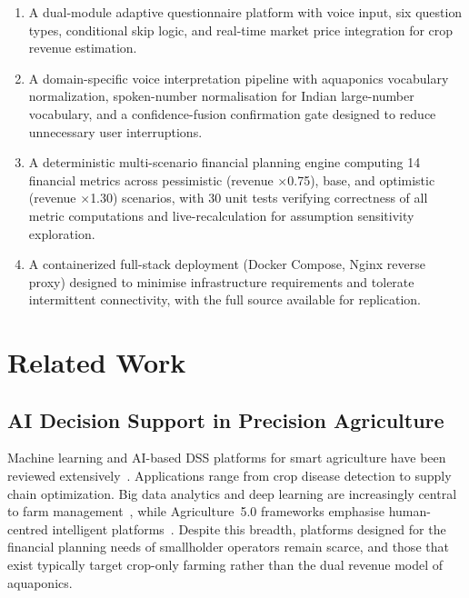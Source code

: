 \documentclass[runningheads]{llncs}
\begin{document}
\begin{enumerate}
  \item A dual-module adaptive questionnaire platform with voice
        input, six question types, conditional skip logic, and
        real-time market price integration for crop revenue estimation.

  \item A domain-specific voice interpretation pipeline with
        aquaponics vocabulary normalization, spoken-number normalisation
        for Indian large-number vocabulary, and a confidence-fusion
        confirmation gate designed to reduce unnecessary user interruptions.

  \item A deterministic multi-scenario financial planning engine
        computing 14 financial metrics across pessimistic
        (revenue $\times$0.75), base, and optimistic
        (revenue $\times$1.30) scenarios, with 30 unit tests
        verifying correctness of all metric computations and
        live-recalculation for assumption sensitivity exploration.

  \item A containerized full-stack deployment (Docker Compose,
        Nginx reverse proxy) designed to minimise infrastructure
        requirements and tolerate intermittent connectivity, with
        the full source available for replication.
\end{enumerate}


\section{Related Work}
\label{sec:related}

\subsection{AI Decision Support in Precision Agriculture}

Machine learning and AI-based DSS platforms for smart agriculture have
been reviewed extensively~\cite{ref2,ref15,ref23,ref24,ref27,ref32}.
Applications range from crop disease detection to supply chain
optimization. Big data analytics and deep learning are increasingly
central to farm management~\cite{ref23,ref24}, while Agriculture~5.0
frameworks emphasise human-centred intelligent platforms~\cite{ref32}.
Despite this breadth, platforms designed for the financial planning
needs of smallholder operators remain scarce, and those that exist
typically target crop-only farming rather than the dual revenue model
of aquaponics.
\end{document}

